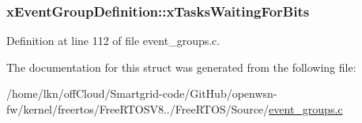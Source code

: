 \subsubsection[{\texorpdfstring{x\+Tasks\+Waiting\+For\+Bits}{xTasksWaitingForBits}}]{ x\+Event\+Group\+Definition\+::x\+Tasks\+Waiting\+For\+Bits}\hypertarget{structx_event_group_definition_a6570ba98d93dcba9cb03de0c62df9044}{}\label{structx_event_group_definition_a6570ba98d93dcba9cb03de0c62df9044}


Definition at line 112 of file event\+\_\+groups.\+c.



The documentation for this struct was generated from the following file\+:\begin{DoxyCompactItemize}
\item 
/home/lkn/off\+Cloud/\+Smartgrid-\/code/\+Git\+Hub/openwsn-\/fw/kernel/freertos/\+Free\+R\+T\+O\+S\+V8../\+Free\+R\+T\+O\+S/\+Source/\hyperlink{event__groups_8c}{event\+\_\+groups.\+c}\end{DoxyCompactItemize}
